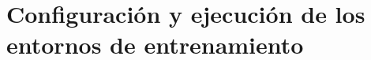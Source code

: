 \chapter{Configuración y ejecución de los entornos de entrenamiento}
\label{cap:configuracion_ejecucion}

